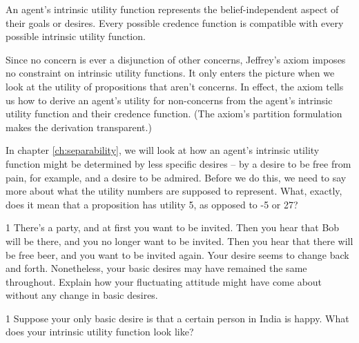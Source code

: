 An agent's intrinsic utility function represents the belief-independent aspect
of their goals or desires. Every possible credence function is compatible with
every possible intrinsic utility function.

Since no concern is ever a disjunction of other concerns, Jeffrey's axiom
imposes no constraint on intrinsic utility functions. It only enters the picture
when we look at the utility of propositions that aren't concerns. In effect, the
axiom tells us how to derive an agent's utility for non-concerns from the
agent's intrinsic utility function and their credence function. (The axiom's
partition formulation makes the derivation transparent.)
 
In chapter \ref{ch:separability}, we will look at how an agent's intrinsic
utility function might be determined by less specific desires -- by a desire to
be free from pain, for example, and a desire to be admired. Before we do this,
we need to say more about what the utility numbers are supposed to represent.
What, exactly, does it mean that a proposition has utility 5, as opposed to -5
or 27?


\begin{exercise}{1}
  There's a party, and at first you want to be invited. Then you hear that Bob
  will be there, and you no longer want to be invited. Then you hear that
  there will be free beer, and you want to be invited again. Your desire seems
  to change back and forth. Nonetheless, your basic desires may have
  remained the same throughout. Explain how your fluctuating attitude
  might have come about without any change in basic desires.
\end{exercise}

\begin{exercise}{1}
  Suppose your only basic desire is that a certain person in India is happy.
  What does your intrinsic utility function look like?
\end{exercise}

